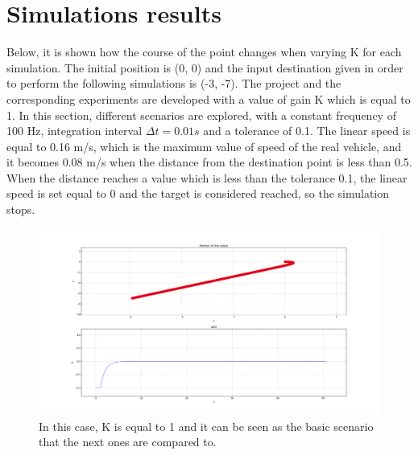 \documentclass[a4paper,11pt,oneside]{book}
\begin{document}
\section{Simulations results}
Below, it is shown how the course of the point changes when varying K for each simulation. The initial position is (0, 0) and the input destination given in order to perform the following simulations is (-3, -7). The project and the corresponding experiments are developed with a value of gain K which is equal to 1. In this section, different scenarios are explored, with a constant frequency of 100 Hz, integration interval $\Delta t = 0.01 s$ and a tolerance of 0.1. The linear speed is equal to 0.16 m/s, which is the maximum value of speed of the real vehicle, and it becomes 0.08 m/s when the distance from the destination point is less than 0.5. When the distance reaches a value which is less than the tolerance 0.1, the linear speed is set equal to 0 and the target is considered reached, so the simulation stops.

\begin{figure}[H]
\centering
\hspace*{-2.3in}
\includegraphics[width=1.9\textwidth]{figs/simulations/1_2}
\caption[Simulation: K = 1]{In this case, K is equal to 1 and it can be seen as the basic scenario that the next ones are compared to.}
\end{figure}
\end{document}
